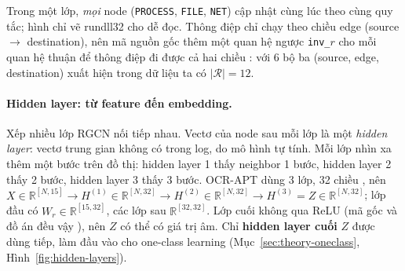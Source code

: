 Trong một lớp, \emph{mọi} node (\texttt{PROCESS}, \texttt{FILE}, \texttt{NET}) cập nhật cùng lúc theo cùng quy tắc; hình chỉ vẽ rundll32 cho dễ đọc. Thông điệp chỉ chạy theo chiều edge (source $\rightarrow$ destination), nên mã nguồn gốc thêm một quan hệ ngược \texttt{inv\_}$r$ cho mỗi quan hệ thuận để thông điệp đi được cả hai chiều \cite{ocrapt_repo}: với 6 bộ ba (source, edge, destination) xuất hiện trong dữ liệu ta có $|\mathcal{R}| = 12$.

\paragraph{Hidden layer: từ feature đến embedding.}
Xếp nhiều lớp RGCN nối tiếp nhau. Vectơ của node sau mỗi lớp là một \emph{hidden layer}: vectơ trung gian không có trong log, do mô hình tự tính. Mỗi lớp nhìn xa thêm một bước trên đồ thị: hidden layer 1 thấy neighbor 1 bước, hidden layer 2 thấy 2 bước, hidden layer 3 thấy 3 bước. OCR-APT dùng 3 lớp, 32 chiều \cite[§7.2.1]{aly2025ocrapt}, nên $X \in \mathbb{R}^{[N, 15]} \rightarrow H^{(1)} \in \mathbb{R}^{[N, 32]} \rightarrow H^{(2)} \in \mathbb{R}^{[N, 32]} \rightarrow H^{(3)} = Z \in \mathbb{R}^{[N, 32]}$; lớp đầu có $W_r \in \mathbb{R}^{[15, 32]}$, các lớp sau $\mathbb{R}^{[32, 32]}$. Lớp cuối không qua ReLU (mã gốc và đồ án đều vậy \cite{ocrapt_repo}), nên $Z$ có thể có giá trị âm. Chỉ \textbf{hidden layer cuối} $Z$ được dùng tiếp, làm đầu vào cho one-class learning (Mục~\ref{sec:theory-oneclass}, Hình~\ref{fig:hidden-layers}).

